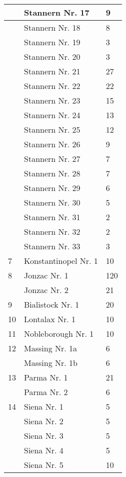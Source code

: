 \documentclass[a4paper, 11pt, oneside, polutonikogreek, german]{article}
\begin{document}
\begin{center}
\begin{longtable}{|l|l|l|}
          & Stannern Nr. 17 & 9 \\ \hline
          & Stannern Nr. 18 & 8 \\ \hline
          & Stannern Nr. 19 & 3 \\ \hline
          & Stannern Nr. 20 & 3 \\ \hline
          & Stannern Nr. 21 & 27 \\ \hline
          & Stannern Nr. 22 & 22 \\ \hline
          & Stannern Nr. 23 & 15 \\ \hline
          & Stannern Nr. 24 & 13 \\ \hline
          & Stannern Nr. 25 & 12 \\ \hline
          & Stannern Nr. 26 & 9 \\ \hline
          & Stannern Nr. 27 & 7 \\ \hline
          & Stannern Nr. 28 & 7 \\ \hline
          & Stannern Nr. 29 & 6 \\ \hline
          & Stannern Nr. 30 & 5 \\ \hline
          & Stannern Nr. 31 & 2 \\ \hline
          & Stannern Nr. 32 & 2 \\ \hline
          & Stannern Nr. 33 & 3 \\ \hline
        7 & Konstantinopel Nr. 1 & 10 \\ \hline
        8 & Jonzac Nr. 1 & 120 \\ \hline
          & Jonzac Nr. 2 & 21 \\ \hline
        9 & Bialistock Nr. 1 & 20 \\ \hline
        10 & Lontalax Nr. 1 & 10 \\ \hline
        11 & Nobleborough Nr. 1 & 10 \\ \hline
        12 & Massing Nr. 1a & 6 \\ \hline
          & Massing Nr. 1b & 6 \\ \hline
        13 & Parma Nr. 1 & 21 \\ \hline
          & Parma Nr. 2 & 6 \\ \hline
        14 & Siena Nr. 1 & 5 \\ \hline
          & Siena Nr. 2 & 5 \\ \hline
          & Siena Nr. 3 & 5 \\ \hline
          & Siena Nr. 4 & 5 \\ \hline
          & Siena Nr. 5 & 10 \\ \hline

\end{longtable}
\end{center}
\end{document}
